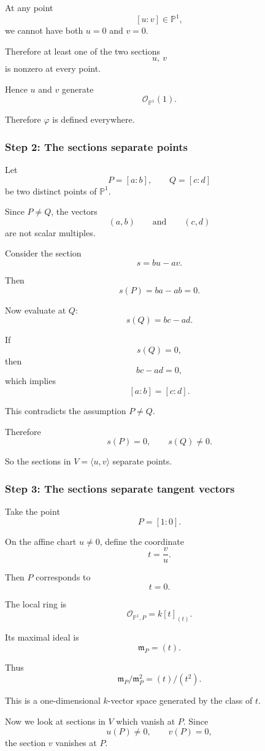 \documentclass[12pt,a4paper]{article}
\theoremstyle{notespace}
\begin{document}
At any point
\[
[u:v]\in\mathbb P^1,
\]
we cannot have both \(u=0\) and \(v=0\).

Therefore at least one of the two sections
\[
u,\ v
\]
is nonzero at every point.

Hence \(u\) and \(v\) generate
\[
\mathcal O_{\mathbb P^1}(1).
\]

Therefore \(\varphi\) is defined everywhere.

\subsubsection*{Step 2: The sections separate points}

Let
\[
P=[a:b],
\qquad
Q=[c:d]
\]
be two distinct points of \(\mathbb P^1\).

Since \(P\neq Q\), the vectors
\[
(a,b)
\qquad\text{and}\qquad
(c,d)
\]
are not scalar multiples.

Consider the section
\[
s=bu-av.
\]

Then
\[
s(P)=ba-ab=0.
\]

Now evaluate at \(Q\):
\[
s(Q)=bc-ad.
\]

If
\[
s(Q)=0,
\]
then
\[
bc-ad=0,
\]
which implies
\[
[a:b]=[c:d].
\]

This contradicts the assumption \(P\neq Q\).

Therefore
\[
s(P)=0,
\qquad
s(Q)\neq0.
\]

So the sections in \(V=\langle u,v\rangle\) separate points.

\subsubsection*{Step 3: The sections separate tangent vectors}

Take the point
\[
P=[1:0].
\]

On the affine chart \(u\neq0\), define the coordinate
\[
t=\frac vu.
\]

Then \(P\) corresponds to
\[
t=0.
\]

The local ring is
\[
\mathcal O_{\mathbb P^1,P}=k[t]_{(t)}.
\]

Its maximal ideal is
\[
\mathfrak m_P=(t).
\]

Thus
\[
\mathfrak m_P/\mathfrak m_P^2
=
(t)/(t^2).
\]

This is a one-dimensional \(k\)-vector space generated by the class of \(t\).

Now we look at sections in \(V\) which vanish at \(P\). Since
\[
u(P)\neq0,
\qquad
v(P)=0,
\]
the section \(v\) vanishes at \(P\).
\end{document}
